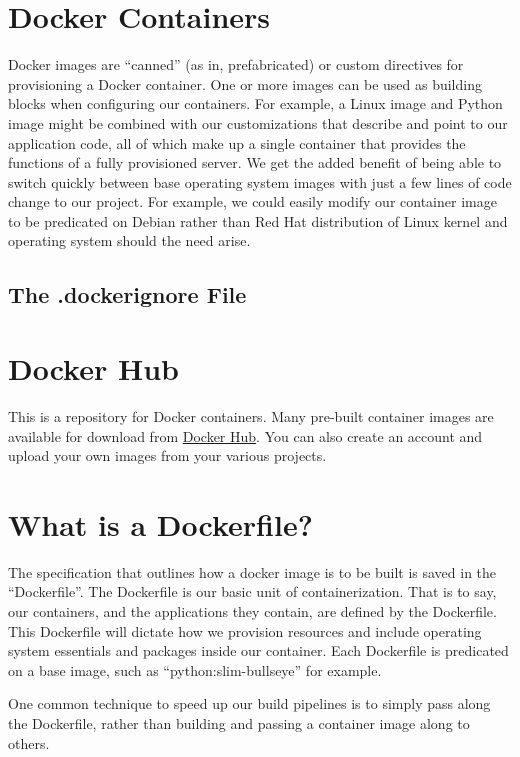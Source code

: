 \section{Docker Containers}

\justify{}
Docker images are ``canned'' (as in, prefabricated) or custom directives for provisioning a Docker container. One or more
images can be used as building blocks when configuring our containers. For example, a Linux image and Python image might
be combined with our customizations that describe and point to our application code, all of which make up a single container
that provides the functions of a fully provisioned server. We get the added
benefit of being able to switch quickly between base operating system images with just a few lines of code change to our
project. For example, we could easily modify our container image to be predicated on Debian
rather than Red Hat distribution of Linux kernel and operating system should the need arise.

\subsection{The .dockerignore File}

\section{Docker Hub}

\justify{}
This is a repository for Docker containers. Many pre-built container images are available for download
from \href{https://hub.docker.com/}{Docker Hub}. You can also create an account and upload your own images from your various
projects.

\section{What is a Dockerfile?}

\justify{}
The specification that outlines how a docker image is to be built is saved in the ``Dockerfile''.
The Dockerfile is our basic unit of containerization. That is to say, our containers, and the applications they contain, are defined by the
Dockerfile. This Dockerfile will dictate how we provision resources and include operating system essentials and packages inside our container. Each Dockerfile is predicated on a base image, such as ``python:slim-bullseye'' for example.

\justify{}
One common technique to speed up our build pipelines is to simply pass along the Dockerfile, rather than
building and passing a container image along to others.


